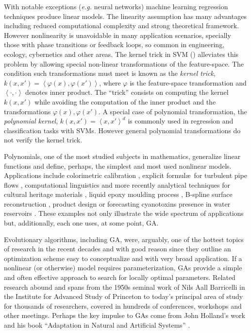 \documentclass[preprint,authoryear,12pt]{elsarticle}
\newcommand{\at}[1]{\ensuremath{\!\left(#1\right)}}
\begin{document}
With notable exceptions (\emph{e.g.} neural networks) machine learning regression techniques produce linear models. The linearity assumption has many advantages including reduced computational complexity and strong the\-o\-re\-ti\-cal framework. However nonlinearity is unavoidable in many application scenarios, specially those with phase transitions or feedback loops, so common in engineering, ecology, cybernetics and other areas. The kernel trick in \ac{SVM} (\cite{scholkopf1997kernel, liang2012eigen, Bao:2013aa}) alleviates this problem by allowing special non-linear transformations of the feature-space. The condition such transformations must meet is known as the \emph{kernel trick}, $k\at{x,x'} = \left< \varphi\at{x}, \varphi\at{x'} \right>$, where $\varphi$ is the feature-space transformation and $\left<\cdot,\cdot\right>$ denotes inner product. The ``trick'' consists on computing the kernel $k\at{x,x'}$ while avoiding the computation of the inner product and the transformations $\varphi\at{x}, \varphi\at{x'}$. A special case of polynomial transformation, the \emph{polynomial kernel}, $k\at{x,x'} = \left<x,x'\right>^d$ is commonly used in regression and classification tasks with \acp{SVM}. However general polynomial transformations do not verify the kernel trick.

Polynomials, one of the most studied subjects in mathematics, generalize li\-ne\-ar functions and define, perhaps, the simplest and most used nonlinear models. Applications include colorimetric calibration \citep{Mendes:2005aa}, explicit formul\ae\ for turbulent pipe flows
 \citep{Davidson:1999aa}, computational linguistics \citep{Sanchez:2009aa} and more recently analytical techniques for cultural heritage materials \citep{Csefalvayova:2010aa}, liquid epoxy moulding process \citep{Chan:2011aa}, B-spline surface reconstruction \citep{Galvez:2012aa}, product design \citep{Chan:2012aa} or forecasting cyanotoxins presence in water reservoirs \citep{Garcia-Nieto:2013aa}. These examples not only illustrate the wide spectrum of applications but, additionally, each one uses, at some point, \ac{GA}.

Evolutionary algorithms, including \ac{GA}, were, arguably, one of the hottest topics of research in the recent decades and with good reason since they outline an optimization scheme easy to conceptualize and with very broad application. If a nonlinear (or otherwise) model requires parameterization, \acp{GA} provide a simple and often effective approach to search for locally optimal parameters. Related research abound and spans from the 1950s seminal work of Nils Aall Barricelli \citep{Barricelli:1962aa} in the Institute for Advanced Study of Princeton to today's principal area of study for thousands of researchers, covered in hundreds of conferences, workshops and other meetings. Perhaps the key impulse to \acp{GA} come from John Holland's work and his book ``Adaptation in Natural and Artificial Systems'' \citep{Holland:1975aa}. 
\end{document}
